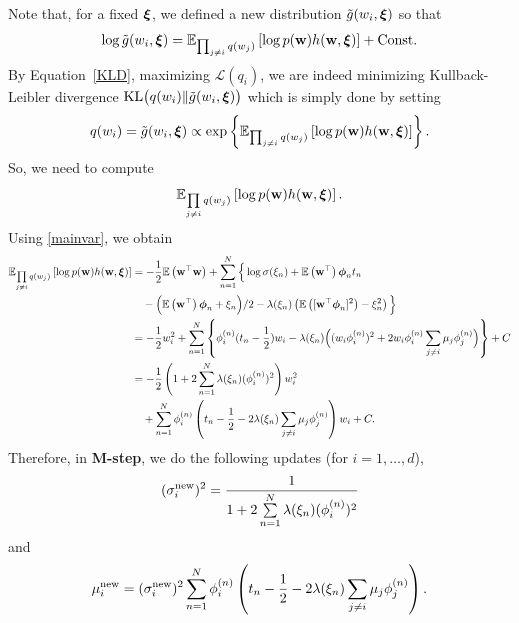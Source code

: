 \documentclass[12pt, fullpage,letterpaper]{article}
\begin{document}
\begin{enumerate}
\begin{enumerate}
{Note that, for a fixed $\boldsymbol{\xi}$,  we defined a new distribution $\tilde{g}(w_i,\boldsymbol{\xi})$ so that 
$$\log \tilde{g}(w_i,\boldsymbol{\xi}) = \mathbb{E}_{\prod_{j\neq i} q(w_j)}\left[\log p({\bf w})h({\bf w},\boldsymbol{\xi})\right] +{\rm Const.}$$
By Equation~\ref{KLD}, maximizing $\mathcal{L}(q_i)$, we are indeed minimizing Kullback-Leibler divergence ${\rm KL}\big(q(w_i)\|\tilde{g}(w_i,\boldsymbol{\xi})\big)$ which is simply done by setting 
$$q(w_i) = \tilde{g}(w_i,\boldsymbol{\xi}) \propto \exp\left\{\mathbb{E}_{\prod_{j\neq i} q(w_j)}\left[\log p({\bf w})h({\bf w},\boldsymbol{\xi})\right]\right\}.$$ 
So, we need to compute 
$$\mathbb{E}_{\prod\limits_{j\neq i} q(w_j)}\left[\log p({\bf w})h({\bf w},\boldsymbol{\xi})\right].$$
Using \ref{mainvar}, we obtain 
\begin{align*}
\mathbb{E}_{\prod\limits_{j\neq i} q(w_j)}\left[\log p({\bf w})h({\bf w},\boldsymbol{\xi})\right] 
& = -\frac{1}{2}\mathbb{E}\left({\bf w}^\top{\bf w}\right) + \sum\limits_{n=1}^N\Big\{ \log\sigma(\xi_n) +  \mathbb{E}\left({\bf w}^\top\right) \boldsymbol{\phi}_n t_n\\
 &\quad  - \Big(\mathbb{E}\left({\bf w}^\top\right)\boldsymbol{\phi}_n + \xi_n\Big)/ 2 - \lambda(\xi_n)\left(\mathbb{E}\left([{\bf w}^\top\boldsymbol{\phi}_n]^2\right)-\xi^2_n\right)\Big\}\\
 & = -\frac{1}{2}w_i^2 +\sum_{n=1}^N\left\{ \phi^{(n)}_i(t_n-\frac{1}{2})w_i -\lambda(\xi_n)\Big((w_i\phi^{(n)}_i)^2 +2w_i\phi^{(n)}_i\sum_{j\neq i}\mu_j\phi^{(n)}_j\Big)\right\} +C\\
 & = -\frac{1}{2}\left(1+2\sum_{n=1}^N\lambda(\xi_n)(\phi^{(n)}_i)^2\right)w_i^2 \\
 &\quad +\sum_{n=1}^N\phi^{(n)}_i\left(t_n -\frac{1}{2} - 2\lambda(\xi_n)\sum_{j\neq i}\mu_j\phi^{(n)}_j\right)w_i + C.
\end{align*}
Therefore, in {\bf M-step}, we do the following updates (for $i=1,\ldots,d$),
$$(\sigma_i^{\rm new})^2 = \frac{1}{1+2\sum\limits_{n=1}^N\lambda(\xi_n)(\phi^{(n)}_i)^2}$$
and 
$$\mu_i^{\rm new} = (\sigma_i^{\rm new})^2\sum_{n=1}^N\phi^{(n)}_i \left(t_n-\frac{1}{2} - 2\lambda(\xi_n)\sum_{j\neq i}\mu_j\phi^{(n)}_j\right).$$

}
\end{enumerate}
\end{enumerate}
\end{document}
